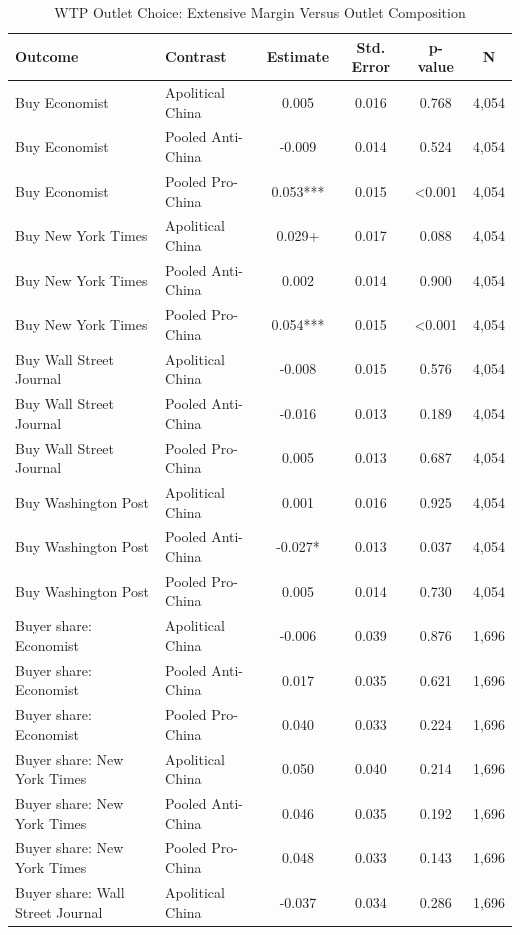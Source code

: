 \begin{table}[H]
\centering
\caption{WTP Outlet Choice: Extensive Margin Versus Outlet Composition}
\label{tab:wtp_outlet_choice}
\footnotesize
\begin{threeparttable}
\begin{tabular}{llcccc}
\toprule
Outcome & Contrast & Estimate & Std. Error & p-value & N \\
\midrule
Buy Economist & Apolitical China & 0.005 & 0.016 & 0.768 & 4,054 \\
Buy Economist & Pooled Anti-China & -0.009 & 0.014 & 0.524 & 4,054 \\
Buy Economist & Pooled Pro-China & 0.053*** & 0.015 & <0.001 & 4,054 \\
Buy New York Times & Apolitical China & 0.029+ & 0.017 & 0.088 & 4,054 \\
Buy New York Times & Pooled Anti-China & 0.002 & 0.014 & 0.900 & 4,054 \\
Buy New York Times & Pooled Pro-China & 0.054*** & 0.015 & <0.001 & 4,054 \\
Buy Wall Street Journal & Apolitical China & -0.008 & 0.015 & 0.576 & 4,054 \\
Buy Wall Street Journal & Pooled Anti-China & -0.016 & 0.013 & 0.189 & 4,054 \\
Buy Wall Street Journal & Pooled Pro-China & 0.005 & 0.013 & 0.687 & 4,054 \\
Buy Washington Post & Apolitical China & 0.001 & 0.016 & 0.925 & 4,054 \\
Buy Washington Post & Pooled Anti-China & -0.027* & 0.013 & 0.037 & 4,054 \\
Buy Washington Post & Pooled Pro-China & 0.005 & 0.014 & 0.730 & 4,054 \\
Buyer share: Economist & Apolitical China & -0.006 & 0.039 & 0.876 & 1,696 \\
Buyer share: Economist & Pooled Anti-China & 0.017 & 0.035 & 0.621 & 1,696 \\
Buyer share: Economist & Pooled Pro-China & 0.040 & 0.033 & 0.224 & 1,696 \\
Buyer share: New York Times & Apolitical China & 0.050 & 0.040 & 0.214 & 1,696 \\
Buyer share: New York Times & Pooled Anti-China & 0.046 & 0.035 & 0.192 & 1,696 \\
Buyer share: New York Times & Pooled Pro-China & 0.048 & 0.033 & 0.143 & 1,696 \\
Buyer share: Wall Street Journal & Apolitical China & -0.037 & 0.034 & 0.286 & 1,696 \\

\end{tabular}
\end{threeparttable}
\end{table}
